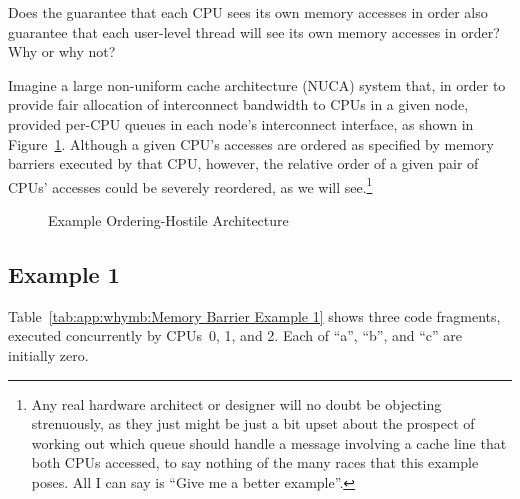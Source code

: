 \QuickQuiz{}
	Does the guarantee that each CPU sees its own memory accesses
	in order also guarantee that each user-level thread will see
	its own memory accesses in order?
	Why or why not?
 \QuickQuizEnd

Imagine a large non-uniform cache architecture (NUCA) system that,
in order to provide fair allocation
of interconnect bandwidth to CPUs in a given node, provided per-CPU
queues in each node's interconnect interface, as shown in
Figure~\ref{fig:app:whymb:Example Ordering-Hostile Architecture}.
Although a given CPU's accesses are ordered as specified by memory
barriers executed by that CPU, however, the relative order of a
given pair of CPUs' accesses could be severely reordered,
as we will see.\footnote{
	Any real hardware architect or designer will no doubt be
	objecting strenuously,
	as they just might be just a bit upset about the prospect of working
	out which queue should handle a message involving a cache line
	that both CPUs accessed, to say nothing of the many races that
	this example poses.
	All I can say is ``Give me a better example''.}

\begin{figure}[htb]
\centering
{}
\caption{Example Ordering-Hostile Architecture}
\label{fig:app:whymb:Example Ordering-Hostile Architecture}
\end{figure}

\subsection{Example 1}
\label{sec:app:whymb:Example 1}

Table~\ref{tab:app:whymb:Memory Barrier Example 1}
shows three code fragments, executed concurrently by CPUs~0, 1, and 2.
Each of ``a'', ``b'', and ``c'' are initially zero.

